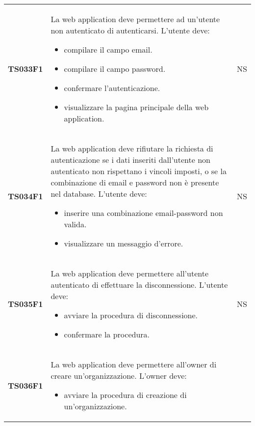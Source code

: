 \documentclass[../piano-di-qualifica.tex]{subfiles}
\begin{document}
\begin{centering}
\begin{longtable}[H]{>{\centering\bfseries}m{3cm} >{}p{10cm} >{\centering\arraybackslash}m{3cm}}
        TS033F1     & La web application deve permettere ad un'utente non autenticato di autenticarsi. \newline
                      L'utente deve:
                      \begin{itemize}
                        \item compilare il campo email.
                        \item compilare il campo password.
                        \item confermare l'autenticazione.
                        \item visualizzare la pagina principale della web application.
                      \end{itemize}
                    & NS \\
        TS034F1     & La web application deve rifiutare la richiesta di autenticazione se i dati inseriti dall'utente non autenticato non rispettano i vincoli imposti, o se la combinazione di email e password non è presente nel database. \newline
                      L'utente deve:
                      \begin{itemize}
                        \item inserire una combinazione email-password non valida.
                        \item visualizzare un messaggio d'errore.
                      \end{itemize}
                    & NS \\
        TS035F1     & La web application deve permettere all'utente autenticato di effettuare la disconnessione. \newline
                      L'utente deve:
                      \begin{itemize}
                        \item avviare la procedura di disconnessione.
                        \item confermare la procedura.
                      \end{itemize}
                    & NS \\
        TS036F1     & La web application deve permettere all'owner di creare un'organizzazione. \newline
                      L'owner deve:
                      \begin{itemize}
                        \item avviare la procedura di creazione di un'organizzazione.

\end{itemize}
\end{longtable}
\end{centering}
\end{document}
